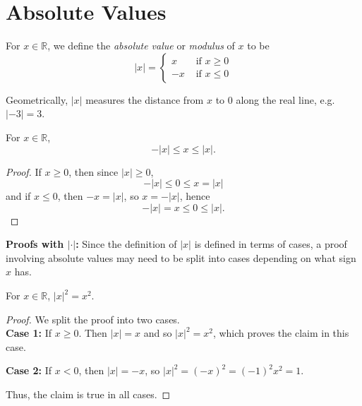 \documentclass[11pt,dvipsnames]{book}
\numberwithin{equation}{section} %
\numberwithin{figure}{section} %
\numberwithin{table}{section} %
\begin{document}
\section{Absolute Values}

\begin{definition}
For $x\in \mathbb{R}$, we define the {\it absolute value} or {\it modulus} of $x$ to be
\[
|x| = \left\{\begin{array}{ll} x & \mbox{ if } x\geq 0 \\ -x & \mbox{ if } x\leq 0 \end{array}\right.
\]
\end{definition}

Geometrically, $|x|$ measures the distance from $x$ to $0$ along the real line, e.g. $|-3|=3$. 

\begin{lemma}
For $x\in\mathbb{R}$,
\[
-|x|\leq x\leq |x|.
\]
\end{lemma}
\begin{proof}
If $x\geq 0$, then since $|x|\geq 0$,
\[
-|x|\leq 0\leq x=|x|
\]
and if $x\leq 0$, then $-x=|x|$, so $x=-|x|$, hence
\[
-|x|=x\leq 0\leq |x|.
\]
\end{proof}

\begin{protip}
{\bf Proofs with $|\cdot|$:} Since the definition of $|x|$ is defined in terms of cases, a proof involving absolute values may need to be split into cases depending on what sign $x$ has. 
\end{protip}

\begin{example}
\label{ex:|x|^2=x^2}
For $x\in \mathbb{R}$, $|x|^2=x^2$. 


\begin{proof}
We split the proof into two cases. \\

{\bf Case 1:} If $x\geq 0$. Then $|x|=x$ and so $|x|^2=x^2$, which proves the claim in this case. 

{\bf Case 2:} If $x<0$, then $|x|=-x$, so $|x|^2=(-x)^2=(-1)^2x^2=1$.

 Thus, the claim is true in all cases. 

\end{proof}
\end{example}
\end{document}
